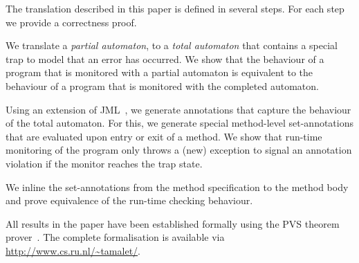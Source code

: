 The translation described in this paper is defined in several
steps. For each step we provide a correctness proof.
\begin{inparaenum}
\item We translate a \emph{partial automaton}, to a \emph{total automaton}
that contains a special trap to model that an error has occurred.
We show that the behaviour of a program that is monitored with a partial
automaton is equivalent to the behaviour of a program that is monitored with
the completed automaton.
\item Using an extension of JML~\cite{LeavensPCCRCK05}, we generate annotations
that capture the behaviour of the total automaton. For this, we
generate special method-level set-annotations that are evaluated upon
entry or exit of a method.
We show that run-time monitoring of the program only throws a (new) exception
to signal an annotation violation if the monitor reaches the trap state.
\item We inline the set-annotations from the method specification
to the method body and prove equivalence of the run-time checking behaviour.
\end{inparaenum}
All results in the paper have been established formally using
the PVS theorem prover~\cite{OwreRRSS96}. The complete formalisation
is available via \url{http://www.cs.ru.nl/~tamalet/}.

